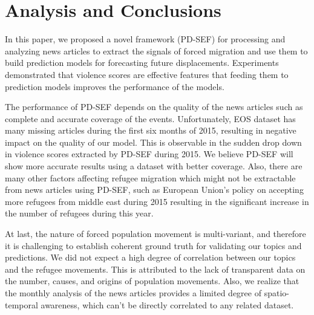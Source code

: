 \section{Analysis and Conclusions}
In this paper, we proposed a novel framework (PD-SEF) for processing and analyzing news articles to extract the signals of forced migration and use them to build prediction models for forecasting future displacements. Experiments demonstrated that violence scores are effective features that feeding them to prediction models improves the performance of the models.

The performance of PD-SEF depends on the quality of the news articles such as complete and accurate coverage of the events. Unfortunately, EOS dataset has many missing articles during the first six months of 2015, resulting in negative impact on the quality of our model. This is observable in the sudden drop down in violence scores extracted by PD-SEF during 2015. We believe PD-SEF will show more accurate results using a dataset with better coverage.
Also, there are many other factors affecting refugee migration which might not be extractable from news articles using PD-SEF, such as European Union's policy on accepting more refugees from middle east during 2015 resulting in the significant increase in the number of refugees during this year.

At last, the nature of forced population movement is multi-variant, and therefore it is challenging to establish coherent ground truth for validating our topics and predictions. We did not expect a high degree of correlation between our topics and the refugee movements. This is attributed to the lack of transparent data on the number, causes, and origins of population movements. Also, we realize that the monthly analysis of the news articles provides a limited degree of spatio-temporal awareness, which can't be directly correlated to any related dataset.